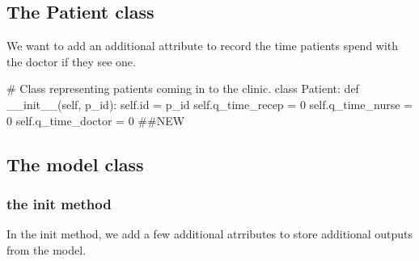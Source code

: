 \documentclass[
  letterpaper,
  DIV=11,
  numbers=noendperiod]{scrreprt}
\newenvironment{Shaded}{}{}
\newcommand{\BuiltInTok}[1]{\textcolor[rgb]{0.84,0.23,0.29}{#1}}
\newcommand{\CommentTok}[1]{\textcolor[rgb]{0.42,0.45,0.49}{#1}}
\newcommand{\DecValTok}[1]{\textcolor[rgb]{0.00,0.36,0.77}{#1}}
\newcommand{\FunctionTok}[1]{\textcolor[rgb]{0.44,0.26,0.76}{#1}}
\newcommand{\KeywordTok}[1]{\textcolor[rgb]{0.84,0.23,0.29}{#1}}
\newcommand{\NormalTok}[1]{\textcolor[rgb]{0.14,0.16,0.18}{#1}}
\newcommand{\OperatorTok}[1]{\textcolor[rgb]{0.14,0.16,0.18}{#1}}
\newcommand{\VariableTok}[1]{\textcolor[rgb]{0.89,0.38,0.04}{#1}}
\begin{document}
\subsection{The Patient class}\label{the-patient-class-1}

We want to add an additional attribute to record the time patients spend
with the doctor if they see one.

\begin{Shaded}
\begin{Highlighting}[]
\CommentTok{\# Class representing patients coming in to the clinic.}
\KeywordTok{class}\NormalTok{ Patient:}
    \KeywordTok{def} \FunctionTok{\_\_init\_\_}\NormalTok{(}\VariableTok{self}\NormalTok{, p\_id):}
        \VariableTok{self}\NormalTok{.}\BuiltInTok{id} \OperatorTok{=}\NormalTok{ p\_id}
        \VariableTok{self}\NormalTok{.q\_time\_recep }\OperatorTok{=} \DecValTok{0}
        \VariableTok{self}\NormalTok{.q\_time\_nurse }\OperatorTok{=} \DecValTok{0}
        \VariableTok{self}\NormalTok{.q\_time\_doctor }\OperatorTok{=} \DecValTok{0} \CommentTok{\#\#NEW}
\end{Highlighting}
\end{Shaded}

\subsection{The model class}\label{the-model-class-1}

\subsubsection{\texorpdfstring{the \textbf{init}
method}{the init method}}\label{the-init-method}

In the init method, we add a few additional atrributes to store
additional outputs from the model.
\end{document}

